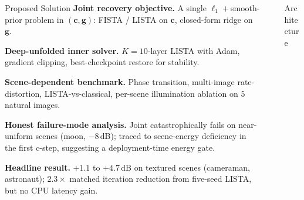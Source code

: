 \documentclass[final]{beamer}
\newlength{\sepwidth}
\newlength{\colwidth}
\newcommand{\separatorcolumn}{
  \begin{column}{\sepwidth}
\end{column}}
\begin{document}
\begin{frame}[t]
\begin{columns}[t]
\begin{column}{\colwidth}
\begin{alertblock}{Proposed Solution}
        \medskip
        \textbf{Joint recovery objective.} A single
        $\ell_1{+}$smooth-prior problem in
        $(\boldsymbol{c},\boldsymbol{g})$: FISTA / LISTA on
        $\boldsymbol{c}$, closed-form ridge on $\boldsymbol{g}$.

        \medskip
        \textbf{Deep-unfolded inner solver.} $K{=}10$-layer LISTA
        \citep{gregor2010lista} with Adam, gradient clipping,
        best-checkpoint restore for stability.

        \medskip
        \textbf{Scene-dependent benchmark.} Phase transition,
        multi-image rate-distortion, LISTA-vs-classical, per-scene
        illumination ablation on $5$ natural images.

        \medskip
        \textbf{Honest failure-mode analysis.} Joint catastrophically
        fails on near-uniform scenes (moon, $-8$\,dB); traced to
        scene-energy deficiency in the first c-step, suggesting a
        deployment-time energy gate.

        \medskip
        \textbf{Headline result.} $+1.1$ to $+4.7$\,dB on textured
        scenes (cameraman, astronaut); $2.3\times$ matched iteration
        reduction from five-seed LISTA, but no CPU latency gain.

      \end{alertblock}

      \vfill

    \end{column}

    \separatorcolumn

    \begin{column}{\colwidth}

      \begin{block}{Architecture}


\end{block}
\end{column}
\end{columns}
\end{frame}
\end{document}
